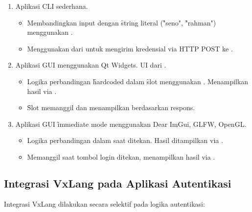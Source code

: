 \begin{enumerate}
    \item {} Aplikasi CLI sederhana.
        \begin{itemize}
            \item {} Membandingkan input  dengan \f{string} literal (\f{"seno"}, \f{"rahman"}) menggunakan .
            \item {} Menggunakan  dari  untuk mengirim kredensial via HTTP POST ke .
        \end{itemize}
    \item {} Aplikasi GUI menggunakan Qt Widgets. UI dari .
        \begin{itemize}
            \item {} Logika perbandingan \f{hardcoded} dalam \f{slot}  menggunakan . Menampilkan hasil via .
            \item {} \f{Slot} memanggil  dan menampilkan  berdasarkan respons.
        \end{itemize}
    \item {} Aplikasi GUI \f{immediate mode} menggunakan Dear ImGui, GLFW, OpenGL.
        \begin{itemize}
            \item {} Logika perbandingan dalam  saat  ditekan. Hasil ditampilkan via .
            \item {} Memanggil  saat tombol login ditekan, menampilkan hasil via .
        \end{itemize}
\end{enumerate}

\subsection{Integrasi VxLang pada Aplikasi Autentikasi}
Integrasi VxLang dilakukan secara selektif pada logika autentikasi:

